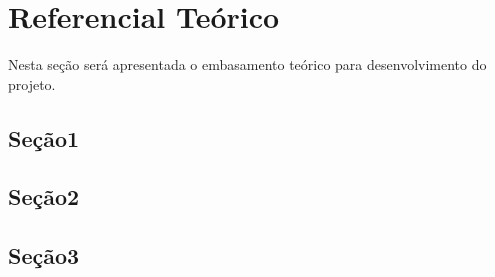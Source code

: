 \chapter{Referencial Teórico}
\label{chap:refteorico}

Nesta seção será apresentada o embasamento teórico para desenvolvimento do projeto.

\section{Seção1}
\label{sec:TMusicalCanto}

\section{Seção2}
\label{sec:EstadoArteF0}

\section{Seção3}
\label{sec:EstimarF0}


 
